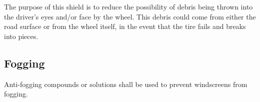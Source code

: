	The purpose of this shield is to reduce the possibility of debris being thrown
	into the driver's eyes and/or face by the wheel. This debris could come from
	either the road surface or from the wheel itself, in the event that the tire
	fails and breaks into pieces.

\subsection{Fogging}

	Anti-fogging compounds or solutions shall be used to prevent windscreens
	from fogging.



